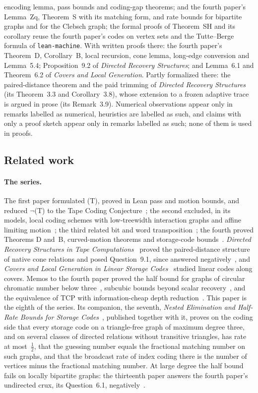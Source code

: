 encoding lemma, pass bounds and coding-gap theorems; and the fourth paper's Lemma~Zq, Theorem~S with its matching form, and
rate bounds for bipartite graphs and for the Clebsch graph; the formal proofs of Theorem~SH and its corollary reuse the fourth
paper's codes on vertex sets and the Tutte--Berge formula of \texttt{lean-machine}. With written proofs there: the fourth paper's Theorem~D,
Corollary~B, local recursion, cone lemma, long-edge conversion and Lemma~5.4; Proposition~9.2 of \emph{Directed Recovery
Structures}; and Lemma~6.1 and Theorem~6.2 of \emph{Covers and Local Generation}. Partly formalized there: the paired-distance
theorem and the paid trimming of \emph{Directed Recovery Structures} (its Theorem~3.3 and Corollary~3.8), whose extension to a
frozen adaptive trace is argued in prose (its Remark~3.9). Numerical observations appear only in remarks labelled as numerical,
heuristics are labelled as such, and claims with only a proof sketch appear only in remarks labelled as such; none of them is
used in proofs.

\subsection{Related work}

\paragraph{The series.} The first paper formulated (T), proved in Lean pass and motion bounds, and reduced $\neg$(T) to the Tape
Coding Conjecture~\cite{FirstPaper2026}; the second excluded, in its models, local coding schemes with low-treewidth interaction graphs
and affine limiting motion~\cite{SecondPaper2026}; the third related bit and word transposition~\cite{ThirdPaper2026}; the fourth proved
Theorems D and~B, curved-motion theorems and storage-code bounds~\cite{FourthPaper2026}. \emph{Directed Recovery Structures in
Tape Computations}~\cite{DirectedRecovery2026} proved the paired-distance structure of native cone relations and posed
Question~9.1, since answered negatively~\cite{StorageCodes2026}, and \emph{Covers and Local Generation in Linear Storage
Codes}~\cite{Covers2026} studied linear codes along covers.
Memos to the fourth paper proved the half bound for graphs of circular chromatic number below three~\cite{CircularMemo2026},
subcubic bounds beyond scalar recovery~\cite{SubcubicMemo2026}, and the equivalence of TCP with information-cheap depth
reduction~\cite{InfoDepthMemo2026}. This paper is the eighth of the series. Its companion, the seventh, \emph{Nested
Elimination and Half-Rate Bounds for Storage Codes}~\cite{SeventhPaper2026}, published together with it, proves on the coding side that every storage code on a triangle-free graph of maximum degree three,
and on several classes of directed relations without transitive triangles, has rate at most~$\frac12$, that the guessing number
equals the fractional matching number on such graphs, and that the broadcast rate of index coding there is the number of vertices
minus the fractional matching number. At large degree the half bound fails on locally bipartite graphs: the thirteenth paper
answers the fourth paper's undirected crux, its Question~6.1, negatively~\cite[Corollary~U]{StorageCodes2026}.

